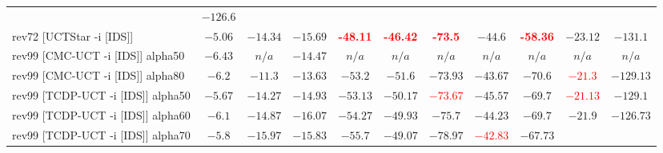 \documentclass{article}
\begin{document}
\begin{tabular}{|l|r@{$\pm$}rr@{$\pm$}rr@{$\pm$}rr@{$\pm$}rr@{$\pm$}rr@{$\pm$}rr@{$\pm$}rr@{$\pm$}rr@{$\pm$}rr@{$\pm$}r|}
& \multicolumn{2}{c|}{$-126.6$}
\\
rev72 [UCTStar -i [IDS]]
& \multicolumn{2}{c}{$-5.06$}
& \multicolumn{2}{c}{$-14.34$}
& \multicolumn{2}{c}{$-15.69$}
& \multicolumn{2}{c}{\textbf{\textcolor{red}{-48.11}}}
& \multicolumn{2}{c}{\textbf{\textcolor{red}{-46.42}}}
& \multicolumn{2}{c}{\textbf{\textcolor{red}{-73.5}}}
& \multicolumn{2}{c}{$-44.6$}
& \multicolumn{2}{c}{\textbf{\textcolor{red}{-58.36}}}
& \multicolumn{2}{c}{$-23.12$}
& \multicolumn{2}{c|}{$-131.1$}
\\
\hline
rev99 [CMC-UCT -i [IDS]] alpha50
& \multicolumn{2}{c}{$-6.43$}
& \multicolumn{2}{c}{\textbf{$n/a$}}
& \multicolumn{2}{c}{\textbf{$-14.47$}}
& \multicolumn{2}{c}{\textbf{$n/a$}}
& \multicolumn{2}{c}{\textbf{$n/a$}}
& \multicolumn{2}{c}{\textbf{$n/a$}}
& \multicolumn{2}{c}{\textbf{$n/a$}}
& \multicolumn{2}{c}{\textbf{$n/a$}}
& \multicolumn{2}{c}{\textbf{$n/a$}}
& \multicolumn{2}{c|}{\textbf{$n/a$}}
\\
rev99 [CMC-UCT -i [IDS]] alpha80
& \multicolumn{2}{c}{$-6.2$}
& \multicolumn{2}{c}{\textbf{$-11.3$}}
& \multicolumn{2}{c}{\textbf{$-13.63$}}
& \multicolumn{2}{c}{$-53.2$}
& \multicolumn{2}{c}{$-51.6$}
& \multicolumn{2}{c}{\textbf{$-73.93$}}
& \multicolumn{2}{c}{\textbf{$-43.67$}}
& \multicolumn{2}{c}{$-70.6$}
& \multicolumn{2}{c}{\textbf{\textcolor{red}{$-21.3$}}}
& \multicolumn{2}{c|}{$-129.13$}
\\
rev99 [TCDP-UCT -i [IDS]] alpha50
& \multicolumn{2}{c}{$-5.67$}
& \multicolumn{2}{c}{$-14.27$}
& \multicolumn{2}{c}{\textbf{$-14.93$}}
& \multicolumn{2}{c}{$-53.13$}
& \multicolumn{2}{c}{$-50.17$}
& \multicolumn{2}{c}{\textbf{\textcolor{red}{$-73.67$}}}
& \multicolumn{2}{c}{\textbf{$-45.57$}}
& \multicolumn{2}{c}{$-69.7$}
& \multicolumn{2}{c}{\textbf{\textcolor{red}{$-21.13$}}}
& \multicolumn{2}{c|}{$-129.1$}
\\
rev99 [TCDP-UCT -i [IDS]] alpha60
& \multicolumn{2}{c}{$-6.1$}
& \multicolumn{2}{c}{$-14.87$}
& \multicolumn{2}{c}{$-16.07$}
& \multicolumn{2}{c}{$-54.27$}
& \multicolumn{2}{c}{$-49.93$}
& \multicolumn{2}{c}{\textbf{$-75.7$}}
& \multicolumn{2}{c}{\textbf{$-44.23$}}
& \multicolumn{2}{c}{$-69.7$}
& \multicolumn{2}{c}{\textbf{$-21.9$}}
& \multicolumn{2}{c|}{$-126.73$}
\\
rev99 [TCDP-UCT -i [IDS]] alpha70
& \multicolumn{2}{c}{$-5.8$}
& \multicolumn{2}{c}{$-15.97$}
& \multicolumn{2}{c}{$-15.83$}
& \multicolumn{2}{c}{$-55.7$}
& \multicolumn{2}{c}{\textbf{$-49.07$}}
& \multicolumn{2}{c}{$-78.97$}
& \multicolumn{2}{c}{\textbf{\textcolor{red}{$-42.83$}}}
& \multicolumn{2}{c}{$-67.73$}

\end{tabular}
\end{document}
